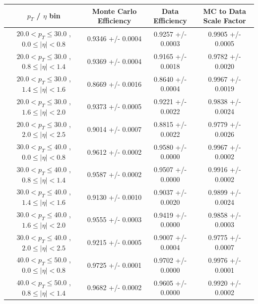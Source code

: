 \documentclass{cmspaper}
\begin{document}
 \begin{table}[!ht]
 \begin{center} 
 \begin{tabular}{|c|c|c|c|}
 \hline
 $p_{T}$ / $\eta$ bin    &  Monte Carlo Efficiency    &  Data Efficiency   &  MC to Data Scale Factor \\   \hline           
\hline
$ 20.0 < p_{T} \le  30.0$ , $  0.0  \le |\eta| <   0.8$   &       0.9346 +/- 0.0004   &       0.9257 +/- 0.0003   &       0.9905 +/- 0.0005   \\   
\hline
$ 20.0 < p_{T} \le  30.0$ , $  0.8  \le |\eta| <   1.4$   &       0.9369 +/- 0.0004   &       0.9165 +/- 0.0018   &       0.9782 +/- 0.0020   \\   
\hline
$ 20.0 < p_{T} \le  30.0$ , $  1.4  \le |\eta| <   1.6$   &       0.8669 +/- 0.0016   &       0.8640 +/- 0.0004   &       0.9967 +/- 0.0019   \\   
\hline
$ 20.0 < p_{T} \le  30.0$ , $  1.6  \le |\eta| <   2.0$   &       0.9373 +/- 0.0005   &       0.9221 +/- 0.0022   &       0.9838 +/- 0.0024   \\   
\hline
$ 20.0 < p_{T} \le  30.0$ , $  2.0  \le |\eta| <   2.5$   &       0.9014 +/- 0.0007   &       0.8815 +/- 0.0022   &       0.9779 +/- 0.0026   \\   
\hline
$ 30.0 < p_{T} \le  40.0$ , $  0.0  \le |\eta| <   0.8$   &       0.9612 +/- 0.0002   &       0.9580 +/- 0.0000   &       0.9967 +/- 0.0002   \\   
\hline
$ 30.0 < p_{T} \le  40.0$ , $  0.8  \le |\eta| <   1.4$   &       0.9587 +/- 0.0002   &       0.9507 +/- 0.0000   &       0.9916 +/- 0.0002   \\   
\hline
$ 30.0 < p_{T} \le  40.0$ , $  1.4  \le |\eta| <   1.6$   &       0.9130 +/- 0.0010   &       0.9037 +/- 0.0020   &       0.9899 +/- 0.0024   \\   
\hline
$ 30.0 < p_{T} \le  40.0$ , $  1.6  \le |\eta| <   2.0$   &       0.9555 +/- 0.0003   &       0.9419 +/- 0.0000   &       0.9858 +/- 0.0003   \\   
\hline
$ 30.0 < p_{T} \le  40.0$ , $  2.0  \le |\eta| <   2.5$   &       0.9215 +/- 0.0005   &       0.9007 +/- 0.0004   &       0.9775 +/- 0.0007   \\   
\hline
$ 40.0 < p_{T} \le  50.0$ , $  0.0  \le |\eta| <   0.8$   &       0.9725 +/- 0.0001   &       0.9702 +/- 0.0000   &       0.9976 +/- 0.0001   \\   
\hline
$ 40.0 < p_{T} \le  50.0$ , $  0.8  \le |\eta| <   1.4$   &       0.9682 +/- 0.0002   &       0.9605 +/- 0.0000   &       0.9920 +/- 0.0002   \\   

\end{tabular}
\end{center}
\end{table}
\end{document}
